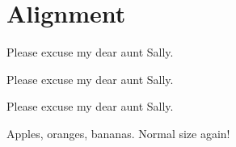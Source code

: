 \documentclass[]{article}
\begin{document}
	\section{Alignment}
	\begin{center}
		Please excuse my dear aunt Sally.
	\end{center}
	\begin{flushleft}
		Please excuse my dear aunt Sally.
	\end{flushleft}
	\begin{flushright}
		Please excuse my dear aunt Sally.
	\end{flushright}
\centering %
\Large
Apples, oranges, bananas. \normalsize Normal size again!
\end{document}

